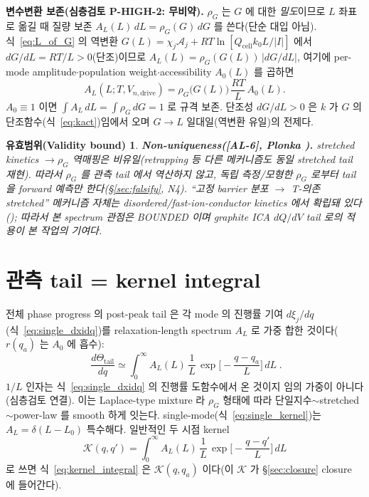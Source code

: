 \documentclass[11pt,a4paper]{article}
\newtheorem*{boundbox}{유효범위(Validity bound)}
\newcommand{\drive}{\mathrm{drive}}
\newcommand{\cell}{\mathrm{cell}}
\newcommand{\AL}[1]{\textsf{[AL-#1]}}
\begin{document}
\textbf{변수변환 보존(심층검토 P-HIGH-2: 무비약).} $\rho_G$ 는 $G$ 에 대한 \emph{밀도}이므로 $L$ 좌표로
옮길 때 질량 보존 $A_L(L)\,dL=\rho_G(G)\,dG$ 를 쓴다(단순 대입 아님). 식~\eqref{eq:L_of_G} 의 역변환
$G(L)=\chi_j\mathcal A_j+RT\ln[Q_\cell k_0 L/|I|]$ 에서 $dG/dL=RT/L>0$(단조)이므로
$A_L(L)=\rho_G(G(L))\,|dG/dL|$, 여기에 per-mode amplitude$\cdot$population weight$\cdot$accessibility
$A_0(L)$ 를 곱하면
\begin{equation}
A_L(L;T,V_{n,\drive})=\rho_G\big(G(L)\big)\,\frac{RT}{L}\,A_0(L).
\label{eq:spectrum}
\end{equation}
$A_0\equiv1$ 이면 $\int A_L\,dL=\int\rho_G\,dG=1$ 로 규격 보존. 단조성 $dG/dL>0$ 은 $k$ 가 $G$ 의
단조함수(식~\eqref{eq:kact})임에서 오며 $G\!\to\!L$ 일대일(역변환 유일)의 전제다.
\begin{boundbox}
\textbf{Non-uniqueness(\AL{6}, Plonka \cite{plonka2001}).} stretched kinetics $\to\rho_G$ 역매핑은
\emph{비유일}(retrapping 등 다른 메커니즘도 동일 stretched tail 재현). 따라서 $\rho_G$ 를 관측 tail 에서
\emph{역산하지 않고}, 독립 측정/모형한 $\rho_G$ 로부터 tail 을 \emph{forward 예측}만 한다(\S\ref{sec:falsify}, N4).
``고정 barrier 분포 $\to$ T-의존 stretched'' 메커니즘 자체는 disordered/fast-ion-conductor kinetics 에서
확립돼 있다(\cite{macdonald2000,lindsey1980}); 따라서 본 spectrum 관점은 BOUNDED 이며 \emph{graphite ICA
$dQ/dV$ tail 로의 적용}이 본 작업의 기여다.
\end{boundbox}

\section{관측 tail = kernel integral}\label{sec:kernel}
전체 phase progress 의 post-peak tail 은 각 mode 의 진행률 기여 $d\xi_j/dq$(식~\eqref{eq:single_dxidq})를
relaxation-length spectrum $A_L$ 로 가중 합한 것이다($r(q_a)$ 는 $A_0$ 에 흡수):
\begin{equation}
\boxed{\;\frac{d\Theta_\mathrm{tail}}{dq}\simeq\int_0^\infty A_L(L)\,\frac1L\,
\exp\!\Big[-\frac{q-q_a}{L}\Big]\,dL\;.}
\label{eq:kernel_integral}
\end{equation}
$1/L$ 인자는 식~\eqref{eq:single_dxidq} 의 진행률 도함수에서 온 것이지 임의 가중이 아니다(심층검토 연결).
이는 Laplace-type mixture 라 $\rho_G$ 형태에 따라 단일지수$\sim$stretched$\sim$power-law 를 smooth 하게
잇는다. single-mode(식~\eqref{eq:single_kernel})는 $A_L=\delta(L-L_0)$ 특수해다. 일반적인 두 시점 kernel
\begin{equation}
\mathcal K(q,q')=\int_0^\infty A_L(L)\,\frac1L\,\exp\!\Big[-\frac{q-q'}{L}\Big]\,dL
\label{eq:Kdef}
\end{equation}
로 쓰면 식~\eqref{eq:kernel_integral} 은 $\mathcal K(q,q_a)$ 이다(이 $\mathcal K$ 가 \S\ref{sec:closure} closure 에 들어간다).
\end{document}
